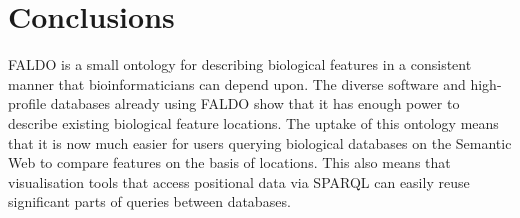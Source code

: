 \section*{Conclusions}
FALDO is a small ontology for describing biological features in a consistent manner that bioinformaticians can depend upon.
The diverse software and high-profile databases already using FALDO show that it has enough power to describe existing biological feature locations.
The uptake of this ontology means that it is now much easier for users querying biological databases on the Semantic Web to compare features on the basis of locations.
This also means that visualisation tools that access positional data via SPARQL can easily reuse significant parts of queries between databases.

